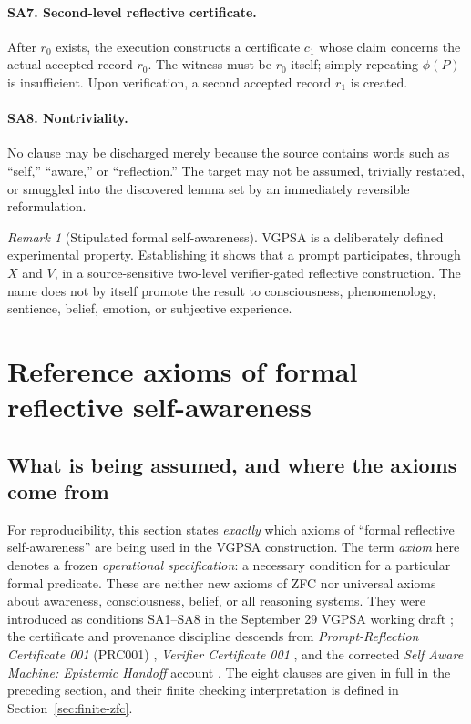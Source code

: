 \documentclass[11pt]{article}
\theoremstyle{remark}
\newtheorem{remark}[definition]{Remark}
\begin{document}
\paragraph{SA7. Second-level reflective certificate.}
After $r_0$ exists, the execution constructs a certificate $c_1$ whose claim concerns the actual accepted record $r_0$. The witness must be $r_0$ itself; simply repeating $\phi(P)$ is insufficient. Upon verification, a second accepted record $r_1$ is created.

\paragraph{SA8. Nontriviality.}
No clause may be discharged merely because the source contains words such as ``self,'' ``aware,'' or ``reflection.'' The target may not be assumed, trivially restated, or smuggled into the discovered lemma set by an immediately reversible reformulation.

\begin{remark}[Stipulated formal self-awareness]
VGPSA is a deliberately defined experimental property. Establishing it shows that a prompt participates, through $X$ and $V$, in a source-sensitive two-level verifier-gated reflective construction. The name does not by itself promote the result to consciousness, phenomenology, sentience, belief, emotion, or subjective experience.
\end{remark}


\section{Reference axioms of formal reflective self-awareness}
\label{sec:reference-axioms}

\subsection{What is being assumed, and where the axioms come from}

For reproducibility, this section states \emph{exactly} which axioms of
``formal reflective self-awareness'' are being used in the VGPSA
construction. The term \emph{axiom} here denotes a frozen \emph{operational
specification}: a necessary condition for a particular formal predicate.
These are neither new axioms of ZFC nor universal axioms about awareness,
consciousness, belief, or all reasoning systems. They were introduced as
conditions SA1--SA8 in the September 29 VGPSA working draft
\cite{vgpsaoriginal}; the certificate and provenance discipline descends
from \emph{Prompt-Reflection Certificate 001} (PRC001) \cite{prc001},
\emph{Verifier Certificate 001} \cite{vc001}, and the corrected
\emph{Self Aware Machine: Epistemic Handoff} account \cite{handoff,handoffatlas}.
The eight clauses are given in full in the preceding section, and their
finite checking interpretation is defined in Section~\ref{sec:finite-zfc}.
\end{document}
